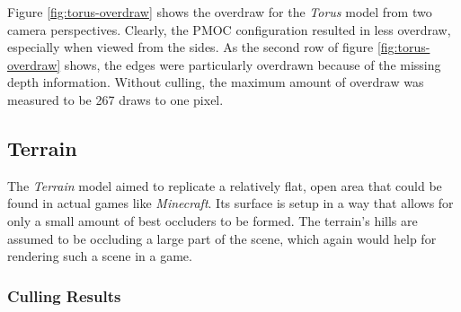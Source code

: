 \noindent
Figure \ref{fig:torus-overdraw} shows the overdraw for the \emph{Torus} model from two 
camera perspectives. Clearly, the \ac{PMOC} configuration resulted 
in less overdraw, especially when viewed from the sides. As the second row of figure 
\ref{fig:torus-overdraw} shows, the edges were particularly overdrawn because of the 
missing depth information. Without culling, the maximum amount of overdraw was measured 
to be 267 draws to one pixel.


\clearpage



\subsection*{Terrain}

The \emph{Terrain} model aimed to replicate a relatively flat, open area that could be found in actual 
games like \emph{Minecraft}. Its surface is setup in a way that allows for only a small amount of best 
occluders to be formed. The terrain's hills are assumed to be occluding a large part of the scene, 
which again would help for rendering such a scene in a game.

\subsubsection*{Culling Results} \label{subsubsec-culling-results-terrain}


